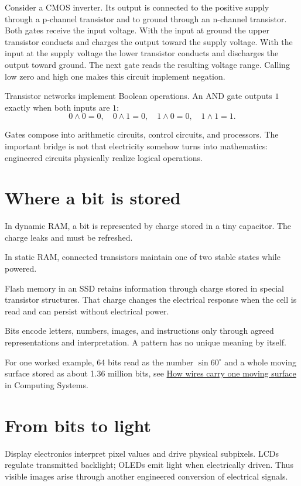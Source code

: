 Consider a CMOS inverter. Its output is
connected to the positive supply through
a p-channel transistor and to ground
through an n-channel transistor. Both
gates receive the input voltage. With
the input at ground the upper transistor
conducts and charges the output toward
the supply voltage. With the input at
the supply voltage the lower transistor
conducts and discharges the output toward
ground. The next gate reads the resulting
voltage range. Calling low zero and high
one makes this circuit implement negation.

Transistor networks implement Boolean
operations. An AND gate outputs $1$
exactly when both inputs are $1$:
$$
0\land0=0,\quad 0\land1=0,
\quad 1\land0=0,\quad 1\land1=1.
$$

Gates compose into arithmetic circuits,
control circuits, and processors.
The important bridge is not that
electricity somehow turns into
mathematics: engineered circuits
physically realize logical operations.

\section{Where a bit is stored}

In dynamic RAM, a bit is represented
by charge stored in a tiny capacitor.
The charge leaks and must be refreshed.

In static RAM, connected transistors
maintain one of two stable states
while powered.

Flash memory in an SSD retains
information through charge stored in
special transistor structures. That
charge changes the electrical response
when the cell is read and can persist
without electrical power.

Bits encode letters, numbers, images,
and instructions only through agreed
representations and interpretation.
A pattern has no unique meaning by
itself.

For one worked example, 64 bits read as
the number $\sin 60^\circ$ and a whole
moving surface stored as about 1.36
million bits, see
\href{https://www.heap-project.org/%
tag/0HM9}{How wires carry one moving
surface} in Computing Systems.

\section{From bits to light}

Display electronics interpret pixel
values and drive physical subpixels.
LCDs regulate transmitted backlight;
OLEDs emit light when electrically
driven. Thus visible images arise
through another engineered conversion
of electrical signals.

